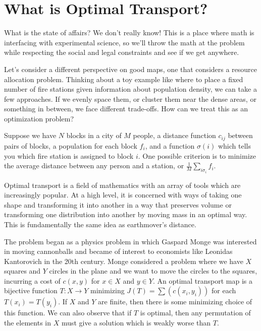 

\section*{What is Optimal Transport?}

What is the state of affairs?  We don't really know!  This is a place where math is interfacing with experimental science, so we'll throw the math at the problem while respecting the social and legal constraints and see if we get anywhere.

Let's consider a different perspective on good maps, one that considers a resource allocation problem.  Thinking about a toy example like where to place a fixed number of fire stations given information about population density, we can take a few approaches.  If we evenly space them, or cluster them near the dense areas, or something in between, we face different trade-offs.  How can we treat this as an optimization problem?

Suppose we have $N$ blocks in a city of $M$ people, a distance function $c_{ij}$ between pairs of blocks, a population for each block $f_i$, and a function $\sigma(i)$ which tells you which fire station is assigned to block $i$.  One possible criterion is to minimize the average distance between any person and a station, or $\frac{1}{M}\sum_{i\sigma_i}f_i$.

Optimal transport is a field of mathematics with an array of tools which are increasingly popular.  At a high level, it is concerned with ways of taking one shape and transforming it into another in a way that preserves volume or transforming one distribution into another by moving mass in an optimal way.  This is fundamentally the same idea as earthmover's distance.

The problem began as a physics problem in which Gaspard Monge was interested in moving cannonballs and became of interest to economists like Leonidas Kantorovich in the 20th century.  Monge considered a problem where we have $X$ squares and $Y$ circles in the plane and we want to move the circles to the squares, incurring a cost of $c(x,y)$ for $x\in X$ and $y\in Y$.  An optimal transport map is a bijective function  $T:X\rightarrow Y$ minimizing $J(T)=\sum (c(x_i,y_i))$ for each $T(x_i)=T(y_i)$.  If $X$ and $Y$ are finite, then there is some minimizing choice of this function.  We can also observe that if $T$ is optimal, then any permutation of the elements in $X$ must give a solution which is weakly worse than $T$.

